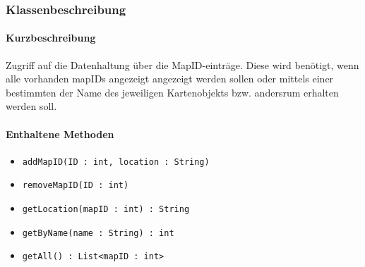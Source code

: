 \subsubsection*{Klassenbeschreibung}%
\paragraph*{Kurzbeschreibung}
Zugriff auf die Datenhaltung über die MapID-einträge. Diese wird benötigt, wenn alle vorhanden mapIDs angezeigt angezeigt werden sollen oder
mittels einer bestimmten der Name des jeweiligen Kartenobjekts bzw. andersrum erhalten werden soll.

\paragraph*{Enthaltene Methoden}
\begin{itemize}
    \item \texttt{addMapID(ID : int, location : String)}
    \item \texttt{removeMapID(ID : int)}
    \item \texttt{getLocation(mapID : int) : String}
    \item \texttt{getByName(name : String) : int}
    \item \texttt{getAll() : List<mapID : int>}
\end{itemize}
